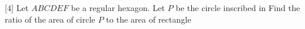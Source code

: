 [4] Let $ABCDEF$ be a regular hexagon. Let $P$ be the circle inscribed in  Find the ratio of the area of circle $P$ to the area of rectangle 